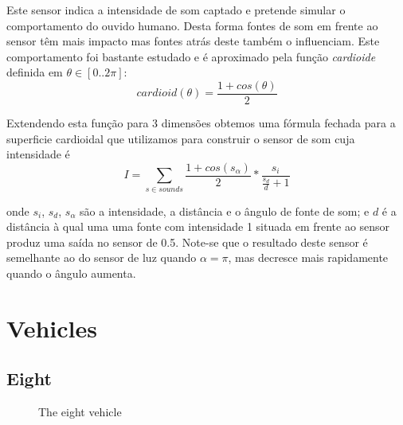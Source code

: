 \documentclass[a4paper]{article}
\begin{document}
\indent Este sensor indica a intensidade de som captado e pretende simular o
comportamento do ouvido humano. Desta forma fontes de som em frente ao sensor têm mais impacto
mas fontes atrás deste também o influenciam. Este comportamento foi bastante estudado e é aproximado pela função \emph{cardioide} definida em $\theta \in [0..2\pi]$:
\[
	cardioid(\theta) = \frac{1 + cos(\theta)}{2}
\]

\indent Extendendo esta função para 3 dimensões obtemos uma fórmula fechada para a superficie cardioidal
que utilizamos para construir o sensor de som cuja intensidade é
\[
	I = \displaystyle\sum\limits_{s \in sounds}\frac{1+cos(s_{\alpha})}{2}*\frac{s_{i}}{\frac{s_{d}}{d}+1}
\] 

onde $s_{i}$, $s_{d}$, $s_{\alpha}$ são a intensidade, a distância e o ângulo de fonte de som;
e $d$ é a distância à qual uma uma fonte com intensidade 1 situada em frente ao sensor produz uma saída no sensor de 0.5.
Note-se que o resultado deste sensor é semelhante ao do sensor de luz quando $\alpha=\pi$,
mas decresce mais rapidamente quando o ângulo aumenta.

\cleardoublepage
\section{Vehicles}

\subsection{Eight}
\begin{figure}[h]
	\centering

	
	\caption{The eight vehicle}
\end{figure}
\end{document}

